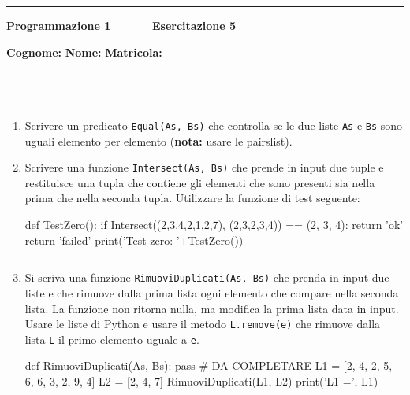 \documentclass[11pt,a4]{article}
\newcommand{\mybox}[2]{$\quad$\fbox{
\begin{minipage}{#1cm}
\hfill\vspace{#2cm}
\end{minipage}
}}
\begin{document}
\thispagestyle{empty}
\hrule
\begin{center}
   {\Large {\bf Programmazione 1 \hspace{3cm} $\quad \quad \quad$ Esercitazione 5}}
\end{center}
{\bf Cognome: }\hspace{2.5cm} {\bf Nome: } \hspace{2.5cm} {\bf Matricola: } \\\
\hrule

\section*{}

\begin{enumerate}

\item Scrivere un predicato {\tt Equal(As, Bs)} che controlla se le due liste {\tt As} e {\tt Bs} sono 
uguali elemento per elemento ({\bf nota:} usare le pairslist).

\item Scrivere una funzione {\tt Intersect(As, Bs)} che prende in input due tuple e restituisce una tupla che contiene gli elementi che sono presenti sia nella prima che nella seconda tupla. Utilizzare la funzione di test seguente:
\begin{python}
def TestZero():
    if Intersect((2,3,4,2,1,2,7), (2,3,2,3,4)) == (2, 3, 4):
        return 'ok'
    return 'failed'
print('Test zero: '+TestZero())
\end{python}
\mybox{15}{2.0}

\item Si scriva una funzione {\tt RimuoviDuplicati(As, Bs)} che prenda in input due liste e che rimuove dalla prima lista ogni elemento che compare nella seconda lista. La funzione non ritorna nulla, ma modifica la prima lista data in input. Usare le liste di Python e usare il metodo {\tt L.remove(e)} che rimuove dalla lista {\tt L} il primo elemento uguale a {\tt e}.
\begin{python}
def RimuoviDuplicati(As, Bs):    
    pass  # DA COMPLETARE
L1 = [2, 4, 2, 5, 6, 6, 3, 2, 9, 4]
L2 = [2, 4, 7]
RimuoviDuplicati(L1, L2)
print('L1 =', L1)
\end{python}
\mybox{15}{2.0}


\end{enumerate}
\end{document}
